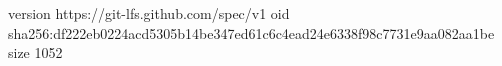version https://git-lfs.github.com/spec/v1
oid sha256:df222eb0224acd5305b14be347ed61c6c4ead24e6338f98c7731e9aa082aa1be
size 1052
